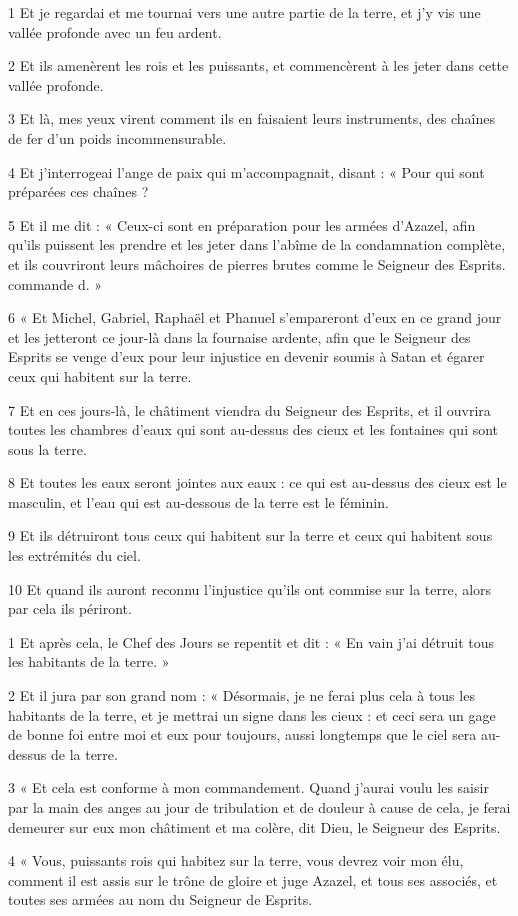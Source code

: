 \par 1 Et je regardai et me tournai vers une autre partie de la terre, et j'y vis une vallée profonde avec un feu ardent.
\par 2 Et ils amenèrent les rois et les puissants, et commencèrent à les jeter dans cette vallée profonde.
\par 3 Et là, mes yeux virent comment ils en faisaient leurs instruments, des chaînes de fer d'un poids incommensurable.
\par 4 Et j'interrogeai l'ange de paix qui m'accompagnait, disant : « Pour qui sont préparées ces chaînes ?
\par 5 Et il me dit : « Ceux-ci sont en préparation pour les armées d'Azazel, afin qu'ils puissent les prendre et les jeter dans l'abîme de la condamnation complète, et ils couvriront leurs mâchoires de pierres brutes comme le Seigneur des Esprits. commande d. »
\par 6 « Et Michel, Gabriel, Raphaël et Phanuel s'empareront d'eux en ce grand jour et les jetteront ce jour-là dans la fournaise ardente, afin que le Seigneur des Esprits se venge d'eux pour leur injustice en devenir soumis à Satan et égarer ceux qui habitent sur la terre.
\par 7 Et en ces jours-là, le châtiment viendra du Seigneur des Esprits, et il ouvrira toutes les chambres d'eaux qui sont au-dessus des cieux et les fontaines qui sont sous la terre.
\par 8 Et toutes les eaux seront jointes aux eaux : ce qui est au-dessus des cieux est le masculin, et l'eau qui est au-dessous de la terre est le féminin.
\par 9 Et ils détruiront tous ceux qui habitent sur la terre et ceux qui habitent sous les extrémités du ciel.
\par 10 Et quand ils auront reconnu l'injustice qu'ils ont commise sur la terre, alors par cela ils périront.


\par 1 Et après cela, le Chef des Jours se repentit et dit : « En vain j'ai détruit tous les habitants de la terre. »
\par 2 Et il jura par son grand nom : « Désormais, je ne ferai plus cela à tous les habitants de la terre, et je mettrai un signe dans les cieux : et ceci sera un gage de bonne foi entre moi et eux pour toujours, aussi longtemps que le ciel sera au-dessus de la terre.
\par 3 « Et cela est conforme à mon commandement. Quand j'aurai voulu les saisir par la main des anges au jour de tribulation et de douleur à cause de cela, je ferai demeurer sur eux mon châtiment et ma colère, dit Dieu, le Seigneur des Esprits.
\par 4 « Vous, puissants rois qui habitez sur la terre, vous devrez voir mon élu, comment il est assis sur le trône de gloire et juge Azazel, et tous ses associés, et toutes ses armées au nom du Seigneur de Esprits.

